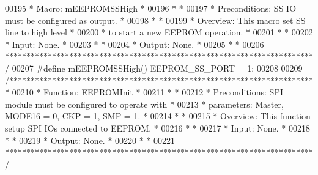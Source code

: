 \begin{DoxyCode}
00195 \textcolor{comment}{* Macro: mEEPROMSSHigh                                                  *}
00196 \textcolor{comment}{*                                                                       *}
00197 \textcolor{comment}{* Preconditions: SS IO must be configured as output.                    *}
00198 \textcolor{comment}{*                                                                       *}
00199 \textcolor{comment}{* Overview: This macro set SS line to high level                        *}
00200 \textcolor{comment}{*           to start a new EEPROM operation.                            *}
00201 \textcolor{comment}{*                                                                       *}
00202 \textcolor{comment}{* Input: None.                                                          *}
00203 \textcolor{comment}{*                                                                       *}
00204 \textcolor{comment}{* Output: None.                                                         *}
00205 \textcolor{comment}{*                                                                       *}
00206 \textcolor{comment}{************************************************************************/}
00207 \textcolor{preprocessor}{#define mEEPROMSSHigh()     EEPROM\_SS\_PORT = 1;}
00208 
00209 \textcolor{comment}{/************************************************************************}
00210 \textcolor{comment}{* Function: EEPROMInit                                                  *}
00211 \textcolor{comment}{*                                                                       *}
00212 \textcolor{comment}{* Preconditions: SPI module must be configured to operate with          *}
00213 \textcolor{comment}{*                 parameters: Master, MODE16 = 0, CKP = 1, SMP = 1.     *}
00214 \textcolor{comment}{*                                                                       *}
00215 \textcolor{comment}{* Overview: This function setup SPI IOs connected to EEPROM.            *}
00216 \textcolor{comment}{*                                                                       *}
00217 \textcolor{comment}{* Input: None.                                                          *}
00218 \textcolor{comment}{*                                                                       *}
00219 \textcolor{comment}{* Output: None.                                                         *}
00220 \textcolor{comment}{*                                                                       *}
00221 \textcolor{comment}{************************************************************************/}

\end{DoxyCode}
